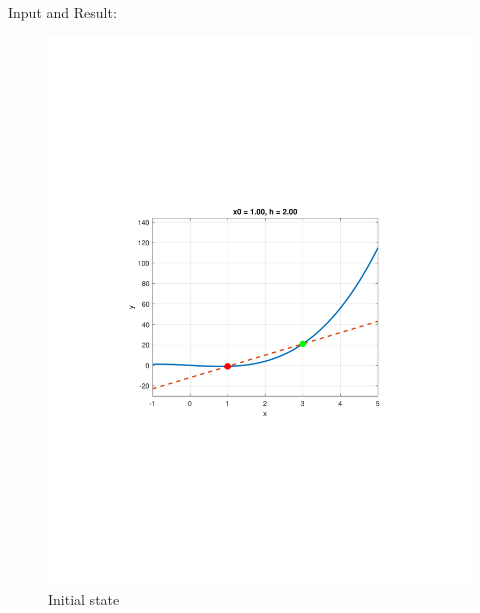 \documentclass[13pt,a4paper]{report}
\begin{document}
\newpage
Input and Result:\\[-0.35cm]
\begin{figure}[H]
    \centering
    \begin{minipage}{0.45\textwidth}
        \centering
        \includegraphics[trim={4.5cm 8.35cm 3.25cm 8cm},clip,scale=0.6]{pdfs/derivative.pdf}
        \caption{Initial state}
    \end{minipage}\hfill
    \begin{minipage}{0.45\textwidth}
        \centering

\end{minipage}
\end{figure}
\end{document}
